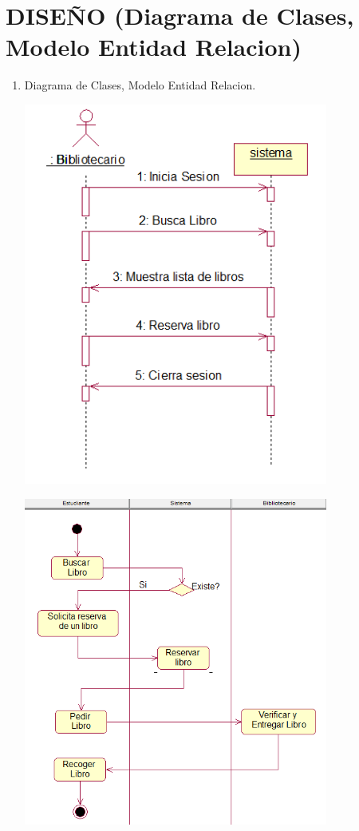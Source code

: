 \section{ DISEÑO (Diagrama de Clases, Modelo Entidad Relacion)} 

\begin{enumerate}[1.]
	\item Diagrama de Clases, Modelo Entidad Relacion.
    


	

	\begin{center}
	\includegraphics[width=10cm]{./Imagenes/img5} 
	\end{center}
	
	\begin{center}
	\includegraphics[width=10cm]{./Imagenes/img6} 
	\end{center}
	

\end{enumerate}
